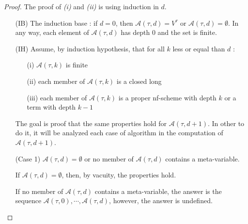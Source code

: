 \documentclass[a4paper,10pt]{article}
\begin{document}
\begin{proof}

  The proof of {\em (i)} and {\em (ii)} is using induction in $d$.

  \begin{itemize}
          \item[(IB)] The induction base : if $d=0$, then $\mathcal{A}(\tau,d) =
            {V^{\tau}}$ or $\mathcal{A}(\tau,d) =
            \emptyset$. In any way, each element of
            $\mathcal{A}(\tau,d)$ has depth $0$ and the set is finite.

            \item[(IH)] Assume, by induction hypothesis, that for all
              $k$ less or equal than $d$ : 
              \begin{itemize}
                     \item[(i)] $\mathcal{A}(\tau,k)$ is finite 
                     \item[(ii)] each member of $\mathcal{A}(\tau,k)$ is a closed long
                     \item[(iii)]each member of $\mathcal{A}(\tau,k)$ is a proper nf-scheme with depth $k$ or a term with depth $k-1$
             \end{itemize}

             The goal is proof that the same properties hold for
             $\mathcal{A}(\tau,d+1)$. In other to do it, it will be
             analyzed each case of algorithm in the computation of $\mathcal{A}(\tau,d+1)$.

             \item[(Case 1)] $\mathcal{A}(\tau,d) = \emptyset$ or no
               member of $\mathcal{A}(\tau,d)$ contains a  meta-variable.

               If $\mathcal{A}(\tau,d) = \emptyset$, then, by vacuity, the
               properties hold.

               If no member of $\mathcal{A}(\tau,d)$ contains a
               meta-variable, the answer is the sequence
               $\mathcal{A}(\tau,0), \cdots ,\mathcal{A}(\tau,d)$,
               however, the answer is undefined.


\end{itemize}
\end{proof}
\end{document}
